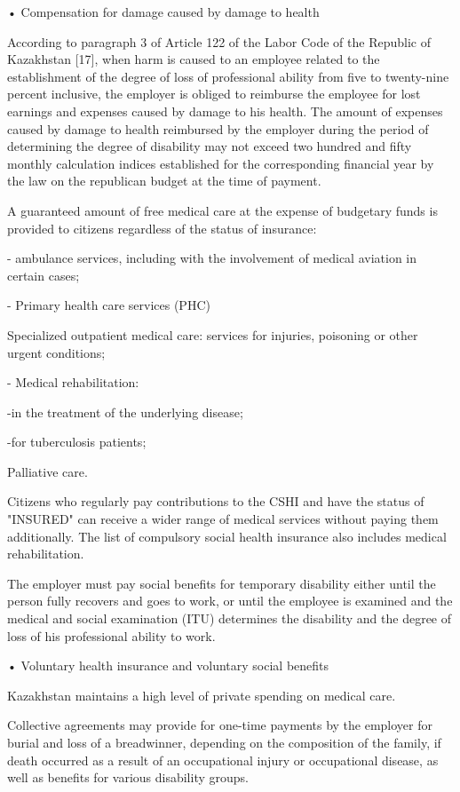 \begin{multicols}{2}
• Compensation for damage caused by damage to health

According to paragraph 3 of Article 122 of the Labor Code of the
Republic of Kazakhstan {[}17{]}, when harm is caused to an employee
related to the establishment of the degree of loss of professional
ability from five to twenty-nine percent inclusive, the employer is
obliged to reimburse the employee for lost earnings and expenses caused
by damage to his health. The amount of expenses caused by damage to
health reimbursed by the employer during the period of determining the
degree of disability may not exceed two hundred and fifty monthly
calculation indices established for the corresponding financial year by
the law on the republican budget at the time of payment.

A guaranteed amount of free medical care at the expense of budgetary
funds is provided to citizens regardless of the status of insurance:

- ambulance services, including with the involvement of medical aviation
in certain cases;

- Primary health care services (PHC) 

Specialized outpatient medical care: services for injuries, poisoning or
other urgent conditions;

- Medical rehabilitation:

  -in the treatment of the underlying disease;

  -for tuberculosis patients;

Palliative care.

Citizens who regularly pay contributions to the CSHI and have the status
of "INSURED" can receive a wider range of medical services without
paying them additionally. The list of compulsory social health insurance
also includes medical rehabilitation.

The employer must pay social benefits for temporary disability either
until the person fully recovers and goes to work, or until the employee
is examined and the medical and social examination (ITU) determines the
disability and the degree of loss of his professional ability to work.

• Voluntary health insurance and voluntary social benefits

Kazakhstan maintains a high level of private spending on medical care.

Collective agreements may provide for one-time payments by the employer
for burial and loss of a breadwinner, depending on the composition of
the family, if death occurred as a result of an occupational injury or
occupational disease, as well as benefits for various disability groups.


\end{multicols}
